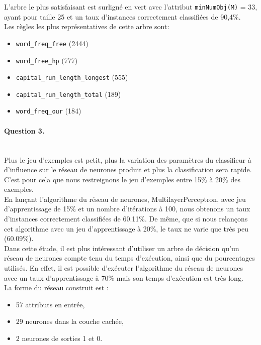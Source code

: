 \documentclass[a4paper,11pt]{article}
\begin{document}
L'arbre le plus \og{}satisfaisant\fg{} est surligné en vert avec l'attribut \texttt{minNumObj(M)} = 33, ayant pour taille 25 et un taux d'instances correctement classifiées de 90,4\%.\\

Les règles les plus représentatives de cette arbre sont:
\begin{itemize}
  \item \texttt{word\_freq\_free} (2444)
  \item \texttt{word\_free\_hp} (777)
  \item \texttt{capital\_run\_length\_longest} (555)
  \item \texttt{capital\_run\_length\_total} (189)
  \item \texttt{word\_freq\_our} (184)
\end{itemize}

\newpage
\paragraph{Question 3.} ~\\

Plus le jeu d'exemples est petit, plus la variation des paramètres du classifieur à d'influence sur le réseau de neurones produit et plus la classification sera rapide. C'est pour cela que nous restreignons le jeu d'exemples entre 15\% à 20\% des exemples.\\

	En lançant l'algorithme du réseau de neurones, \og{}MultilayerPerceptron\fg{}, avec jeu d'apprentissage de 15\% et 	un nombre d'itérations à 100, nous obtenons un taux d'instances correctement classifiées de 60.11\%. De même, que si nous relançons cet algorithme avec un jeu d'apprentissage à 20\%, le taux ne  varie que très peu (60.09\%).\\
	
	Dans cette étude, il est plus intéressant d'utiliser un arbre de décision qu'un réseau de neurones compte tenu du temps d'exécution, ainsi que du pourcentages utilisés. En effet, il est possible d'exécuter l'algorithme du réseau de neurones avec un taux d'apprentissage à 70\% mais son temps d'exécution est très long.\\

La forme du réseau construit est :
\begin{itemize}
  \item 57 attributs en entrée,
  \item 29 neurones dans la couche cachée,
  \item 2 neurones de sorties 1 et 0.
\end{itemize}
\end{document}
